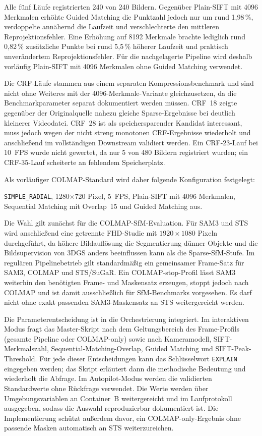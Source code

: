 \documentclass[12pt,a4paper]{article}
\begin{document}
Alle fünf Läufe registrierten 240 von 240 Bildern. Gegenüber Plain-SIFT mit
4096 Merkmalen erhöhte Guided Matching die Punktzahl jedoch nur um rund
1,98\,\%, verdoppelte annähernd die Laufzeit und verschlechterte den mittleren
Reprojektionsfehler. Eine Erhöhung auf 8192 Merkmale brachte lediglich rund
0,82\,\% zusätzliche Punkte bei rund 5,5\,\% höherer Laufzeit und praktisch
unverändertem Reprojektionsfehler. Für die nachgelagerte Pipeline wird deshalb
vorläufig Plain-SIFT mit 4096 Merkmalen ohne Guided Matching verwendet.

Die CRF-Läufe stammen aus einem separaten Kompressionsbenchmark und sind
nicht ohne Weiteres mit der 4096-Merkmale-Variante gleichzusetzen, da die
Benchmarkparameter separat dokumentiert werden müssen. CRF~18 zeigte gegenüber
der Originalquelle nahezu gleiche Sparse-Ergebnisse bei deutlich kleinerer
Videodatei. CRF~28 ist als speichersparender Kandidat interessant, muss jedoch
wegen der nicht streng monotonen CRF-Ergebnisse wiederholt und anschließend im
vollständigen Downstream validiert werden. Ein CRF-23-Lauf bei 10~FPS wurde
nicht gewertet, da nur 5 von 480 Bildern registriert wurden; ein CRF-35-Lauf
scheiterte an fehlendem Speicherplatz.

Als vorläufiger COLMAP-Standard wird daher folgende Konfiguration festgelegt:

\begin{center}
\texttt{SIMPLE\_RADIAL}, 1280$\times$720 Pixel, 5~FPS, Plain-SIFT mit
4096 Merkmalen, Sequential Matching mit Overlap~15 und Guided Matching aus.
\end{center}

Die Wahl gilt zunächst für die COLMAP-SfM-Evaluation. Für SAM3 und STS wird
anschließend eine getrennte FHD-Studie mit $1920\times1080$ Pixeln durchgeführt,
da höhere Bildauflösung die Segmentierung dünner Objekte und die
Bildsupervision von 3DGS anders beeinflussen kann als die Sparse-SfM-Stufe.
Im regulären Pipelinebetrieb gilt standardmäßig ein gemeinsamer Frame-Satz für
SAM3, COLMAP und STS/SuGaR. Ein COLMAP-stop-Profil lässt SAM3 weiterhin den
benötigten Frame- und Maskensatz erzeugen, stoppt jedoch nach COLMAP und ist
damit ausschließlich für SfM-Benchmarks vorgesehen. Es darf nicht ohne exakt
passenden SAM3-Maskensatz an STS weitergereicht werden.

Die Parameterentscheidung ist in die Orchestrierung integriert. Im
interaktiven Modus fragt das Master-Skript nach dem Geltungsbereich des
Frame-Profils (gesamte Pipeline oder COLMAP-only) sowie nach Kameramodell,
SIFT-Merkmalszahl, Sequential-Matching-Overlap, Guided Matching und
SIFT-Peak-Threshold. Für jede dieser Entscheidungen kann das Schlüsselwort
\texttt{EXPLAIN} eingegeben werden; das Skript erläutert dann die methodische
Bedeutung und wiederholt die Abfrage. Im Autopilot-Modus werden die
validierten Standardwerte ohne Rückfrage verwendet. Die Werte werden über
Umgebungsvariablen an Container~B weitergereicht und im Laufprotokoll
ausgegeben, sodass die Auswahl reproduzierbar dokumentiert ist. Die
Implementierung schützt außerdem davor, ein COLMAP-only-Ergebnis ohne
passende Masken automatisch an STS weiterzureichen.
\end{document}
